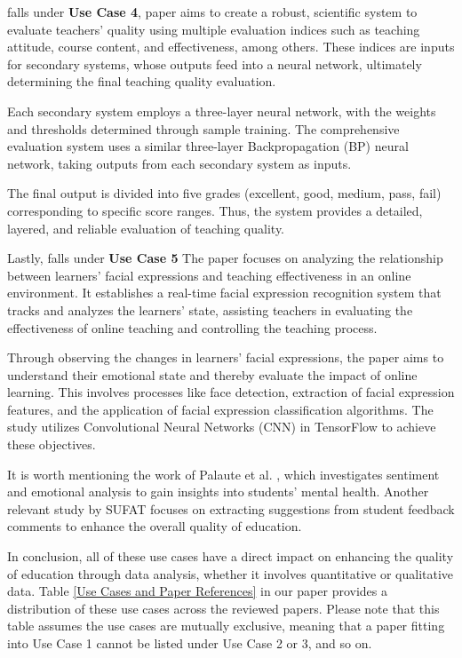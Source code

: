 \documentclass{svproc}
\begin{document}
falls under \textbf{Use Case 4}, paper \cite{BP_Neural_Network-Based_Evaluation_on_University_Teachers'_Teaching_Quality} aims to create a robust, scientific system to evaluate teachers' quality using multiple evaluation indices such as teaching attitude, course content, and effectiveness, among others. These indices are inputs for secondary systems, whose outputs feed into a neural network, ultimately determining the final teaching quality evaluation. 

Each secondary system employs a three-layer neural network, with the weights and thresholds determined through sample training. The comprehensive evaluation system uses a similar three-layer Backpropagation (BP) neural network, taking outputs from each secondary system as inputs. 

The final output is divided into five grades (excellent, good, medium, pass, fail) corresponding to specific score ranges. Thus, the system provides a detailed, layered, and reliable evaluation of teaching quality.

Lastly, falls under \textbf{Use Case 5} 
The paper focuses on analyzing the relationship between learners' facial expressions and teaching effectiveness in an online environment. It establishes a real-time facial expression recognition system that tracks and analyzes the learners' state, assisting teachers in evaluating the effectiveness of online teaching and controlling the teaching process.


Through observing the changes in learners' facial expressions, the paper aims to understand their emotional state and thereby evaluate the impact of online learning. This involves processes like face detection, extraction of facial expression features, and the application of facial expression classification algorithms. The study utilizes Convolutional Neural Networks (CNN) in TensorFlow to achieve these objectives.

It is worth mentioning the work of Palaute et al. \cite{Palaute:_An_Online_Text_Mining_Tool_for_Analyzing_Written_Student_Course_Feedback}, which investigates sentiment and emotional analysis to gain insights into students' mental health. Another relevant study by SUFAT \cite{SUFAT_An_Analytics_Tool_for_Gaining_Insights_from_Student_Feedback_Comments} focuses on extracting suggestions from student feedback comments to enhance the overall quality of education.

In conclusion, all of these use cases have a direct impact on enhancing the quality of education through data analysis, whether it involves quantitative or qualitative data. Table \ref{Use Cases and Paper References} in our paper provides a distribution of these use cases across the reviewed papers. Please note that this table assumes the use cases are mutually exclusive, meaning that a paper fitting into Use Case 1 cannot be listed under Use Case 2 or 3, and so on.
\end{document}
